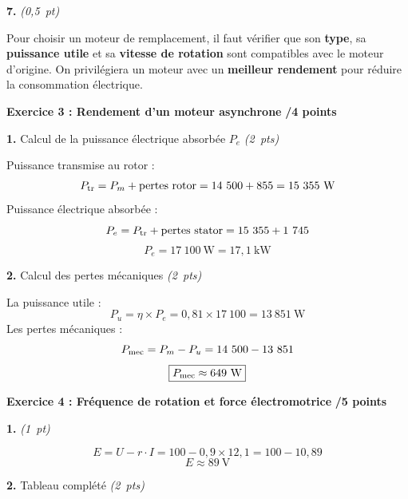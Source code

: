 \documentclass[11pt,a4paper]{article}
\newcommand{\reponse}[1]{%
  \begin{tcolorbox}[colback=green!5!white, colframe=green!50!black,
                    left=2mm, right=2mm, top=1mm, bottom=1mm]
  #1
  \end{tcolorbox}}
\begin{document}
\textbf{7.} \hfill \textit{(0,5~pt)}

\reponse{Pour choisir un moteur de remplacement, il faut vérifier que son \textbf{type}, sa \textbf{puissance utile} et sa \textbf{vitesse de rotation} sont compatibles avec le moteur d'origine. On privilégiera un moteur avec un \textbf{meilleur rendement} pour réduire la consommation électrique.}

\vfill
\newpage

\textbf{Exercice 3 : Rendement d'un moteur asynchrone}
\hfill \textbf{/4 points}

\vspace{4mm}

\textbf{1.} Calcul de la puissance électrique absorbée $P_e$ \hfill \textit{(2~pts)}

\reponse{
Puissance transmise au rotor :
\[P_{\rm tr} = P_m + \text{pertes rotor} = 14~500 + 855 = 15~355~\text{W}\]
Puissance électrique absorbée :
\[P_e = P_{\rm tr} + \text{pertes stator} = 15~355 + 1~745\]
\[\boxed{P_e = 17~100~\text{W} = 17{,}1~\text{kW}}\]
}

\textbf{2.} Calcul des pertes mécaniques \hfill \textit{(2~pts)}

\reponse{
La puissance utile :
\[P_u = \eta \times P_e = 0{,}81 \times 17~100 = 13~851~\text{W}\]
Les pertes mécaniques :
\[P_{\rm mec} = P_m - P_u = 14~500 - 13~851\]
\[\boxed{P_{\rm mec} \approx 649~\text{W}}\]
}

\vfill
\newpage

\textbf{Exercice 4 : Fréquence de rotation et force électromotrice}
\hfill \textbf{/5 points}

\vspace{4mm}

\textbf{1.} \hfill \textit{(1~pt)}

\reponse{
\[E = U - r \cdot I = 100 - 0{,}9 \times 12{,}1 = 100 - 10{,}89\]
\[\boxed{E \approx 89~\text{V}}\]
}

\textbf{2.} Tableau complété \hfill \textit{(2~pts)}

\vspace{3mm}
\end{document}
